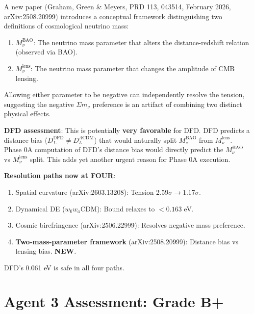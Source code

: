 \documentclass[11pt,a4paper]{article}
\newcommand{\NEW}{\textcolor{dfdblue}{\textbf{NEW}}}
\begin{document}
\begin{tcolorbox}[colback=blue!5!white, colframe=blue!60!black,
  title={\NEW: Graham--Green--Meyers: Two Distinct Neutrino Mass Parameters (PRD 113, 2026)}]

A new paper (Graham, Green \& Meyers, PRD 113, 043514, February 2026, arXiv:2508.20999) introduces a conceptual framework distinguishing two definitions of cosmological neutrino mass:
\begin{enumerate}
\item $M_\nu^{\text{BAO}}$: The neutrino mass parameter that alters the distance-redshift relation (observed via BAO).
\item $M_\nu^{\text{lens}}$: The neutrino mass parameter that changes the amplitude of CMB lensing.
\end{enumerate}

Allowing either parameter to be negative can independently resolve the tension, suggesting the negative $\Sigma m_\nu$ preference is an artifact of combining two distinct physical effects.

\textbf{DFD assessment}: This is potentially \textbf{very favorable} for DFD. DFD predicts a distance bias ($D_L^{\text{DFD}} \neq D_L^{\Lambda\text{CDM}}$) that would naturally split $M_\nu^{\text{BAO}}$ from $M_\nu^{\text{lens}}$. Phase 0A computation of DFD's distance bias would directly predict the $M_\nu^{\text{BAO}}$ vs $M_\nu^{\text{lens}}$ split. This adds yet another urgent reason for Phase 0A execution.

\textbf{Resolution paths now at FOUR}:
\begin{enumerate}
\item Spatial curvature (arXiv:2603.13208): Tension $2.59\sigma \to 1.17\sigma$.
\item Dynamical DE ($w_0 w_a$CDM): Bound relaxes to $< 0.163$ eV.
\item Cosmic birefringence (arXiv:2506.22999): Resolves negative mass preference.
\item \textbf{Two-mass-parameter framework} (arXiv:2508.20999): Distance bias vs lensing bias. \NEW.
\end{enumerate}

DFD's 0.061 eV is safe in all four paths.
\end{tcolorbox}

\section{Agent 3 Assessment: Grade B+}
\end{document}
